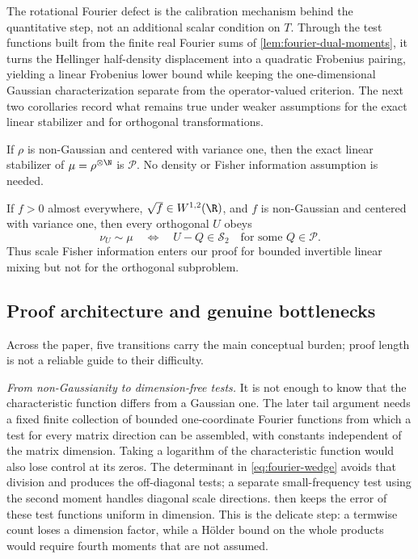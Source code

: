 The rotational Fourier defect is the calibration mechanism behind the
quantitative step, not an additional scalar condition on \(T\).  Through the
test functions built from the finite real Fourier sums of
\cref{lem:fourier-dual-moments}, it turns the Hellinger half-density
displacement into a quadratic Frobenius pairing, yielding a linear Frobenius
lower bound while keeping the one-dimensional Gaussian characterization
separate from the operator-valued criterion.  The next two corollaries record
what remains true under weaker assumptions for the exact linear stabilizer and
for orthogonal transformations.

\begin{corollary}
\label{cor:moment-only-stabilizer}
If \(\rho\) is non-Gaussian and centered with variance one,
then the exact linear stabilizer of
\(\mu=\rho^{\otimes\N}\) is \(\mathcal P\).  No density
or Fisher information assumption is needed.
\end{corollary}

\begin{corollary}
\label{cor:orthogonal-equivalence}
If \(f>0\) almost everywhere, \(\sqrt f\in W^{1,2}(\R)\), and \(f\) is
non-Gaussian and centered with variance one, then every orthogonal \(U\) obeys
\[
 \nu_U\sim\mu
 \quad\Longleftrightarrow\quad
 U-Q\in\mathcal S_2\quad\text{for some }Q\in\mathcal P.
\]
Thus scale Fisher information enters our proof for bounded invertible linear
mixing but not for the orthogonal subproblem.
\end{corollary}

\subsection{Proof architecture and genuine bottlenecks}
\label{sec:proof-architecture}

Across the paper, five transitions carry the main conceptual burden; proof
length is not a reliable guide to their difficulty.

\emph{From non-Gaussianity to dimension-free tests.}
It is not enough to know that the characteristic function differs from a
Gaussian one.  The later tail argument needs a fixed finite collection of
bounded one-coordinate Fourier functions from which a test for every matrix
direction can be assembled, with constants independent of the matrix
dimension.  Taking a logarithm of the characteristic function would also lose
control at its zeros.  The determinant in \eqref{eq:fourier-wedge} avoids that
division and produces the off-diagonal tests; a separate small-frequency test
using the second moment handles diagonal scale directions.
 then keeps the error of these test functions
uniform in dimension.  This is the delicate step: a termwise count loses a
dimension factor, while a H\"older bound on the whole products would require
fourth moments that are not assumed.

